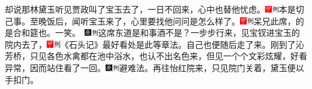 却说那林黛玉听见贾政叫了宝玉去了，一日不回来，心中也替他忧虑。{\includegraphics[width=3mm]{../Images/00002}\includegraphics[width=3mm]{../Images/00011}\footnotesize \kaishu 本是切己事。}至晚饭后，闻听宝玉来了，心里要找他问问是怎么样了。{\includegraphics[width=3mm]{../Images/00002}\includegraphics[width=3mm]{../Images/00011}\footnotesize \kaishu 呆兄此席，的是合和筵也。一笑。　\includegraphics[width=3mm]{../Images/00004}\includegraphics[width=3mm]{../Images/00011}\footnotesize \kaishu 这席东道是和事酒不是？}一步步行来，见宝钗进宝玉的院内去了，{\includegraphics[width=3mm]{../Images/00002}\includegraphics[width=3mm]{../Images/00011}\footnotesize \kaishu 《石头记》最好看处是此等章法。}自己也便随后走了来。刚到了沁芳桥，只见各色水禽都在池中浴水，也认不出名色来，但见一个个文彩炫耀，好看异常，因而站住看了一回。{\includegraphics[width=3mm]{../Images/00004}\includegraphics[width=3mm]{../Images/00011}\footnotesize \kaishu 避难法。}再往怡红院来，只见院门关着，黛玉便以手扣门。

